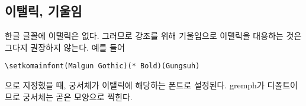 \documentclass[
	12pt,
	a4paper,
	kosection,
	footnote,
	nobookmarks,
	microtype,
]{oblivoir}
\def\oblivoirdblquote#1{``#1''}
\newcommand\xobclass{x\-ob\-liv\-oir\oblivoirallowbreak}
\begin{document}
%
%
%
%

\subsection{이탤릭, 기울임}

한글 글꼴에 이탤릭은 없다. 그러므로 강조를 위해 기울임으로 이탤릭을 대용하는 것은 그다지 권장하지 않는다. 예를 들어 
\begin{verbatim}
\setkomainfont(Malgun Gothic)(* Bold)(Gungsuh)
\end{verbatim}
으로 지정했을 때, 궁서체가 이탤릭에 해당하는 폰트로 설정된다. gremph가 디폴트이므로 궁서체는 곧은 모양으로 찍힌다.
\end{document}
